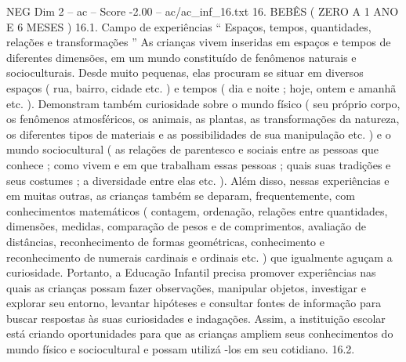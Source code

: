 \begin{textsample}{NEG Dim 2 – ac – Score -2.00 – ac/ac\_inf\_16.txt}  \label{ex:f2_neg_130}
16.
BEBÊS ( ZERO A 1 ANO E 6 MESES ) 16.1.
Campo de experiências “ Espaços, tempos, quantidades, relações e transformações ” As crianças vivem inseridas em espaços e tempos de diferentes dimensões, em um mundo constituído de fenômenos naturais e socioculturais.
Desde muito pequenas, elas procuram se situar em diversos espaços ( rua, bairro, cidade etc. ) e tempos ( dia e noite ; hoje, ontem e amanhã etc. ).
Demonstram também curiosidade sobre o mundo físico ( seu próprio corpo, os fenômenos atmosféricos, os animais, as plantas, as transformações da natureza, os diferentes tipos de materiais e as possibilidades de sua manipulação etc. ) e o mundo sociocultural ( as relações de parentesco e sociais entre as pessoas que conhece ; como vivem e em que trabalham essas pessoas ; quais suas tradições e seus costumes ; a diversidade entre elas etc. ).
Além disso, nessas experiências e em muitas outras, as crianças também se deparam, frequentemente, com conhecimentos matemáticos ( contagem, ordenação, relações entre quantidades, dimensões, medidas, comparação de pesos e de comprimentos, avaliação de distâncias, reconhecimento de formas geométricas, conhecimento e reconhecimento de numerais cardinais e ordinais etc. ) que igualmente aguçam a curiosidade.
Portanto, a Educação Infantil precisa promover experiências nas quais as crianças possam fazer observações, manipular objetos, investigar e explorar seu entorno, levantar hipóteses e consultar fontes de informação para buscar respostas às suas curiosidades e indagações.
Assim, a instituição escolar está criando oportunidades para que as crianças ampliem seus conhecimentos do mundo físico e sociocultural e possam utilizá -los em seu cotidiano. 16.2.

\end{textsample}
